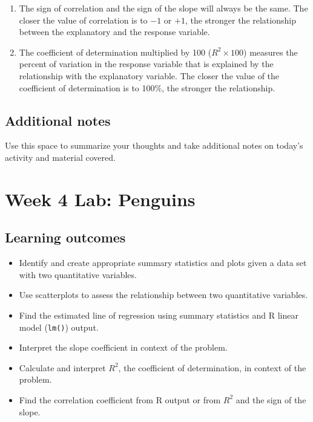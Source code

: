 \documentclass[
]{report}
\begin{document}
\begin{enumerate}
\def\labelenumi{\arabic{enumi}.}
\item
  The sign of correlation and the sign of the slope will always be the same. The closer the value of correlation is to \(-1\) or \(+1\), the stronger the relationship between the explanatory and the response variable.
\item
  The coefficient of determination multiplied by 100 (\(R^2 \times 100\)) measures the percent of variation in the response variable that is explained by the relationship with the explanatory variable. The closer the value of the coefficient of determination is to 100\%, the stronger the relationship.
\end{enumerate}

\hypertarget{additional-notes-6}{%
\subsection{Additional notes}\label{additional-notes-6}}

Use this space to summarize your thoughts and take additional notes on today's activity and material covered.

\newpage

\hypertarget{week-4-lab-penguins}{%
\section{Week 4 Lab: Penguins}\label{week-4-lab-penguins}}


\hypertarget{learning-outcomes-8}{%
\subsection{Learning outcomes}\label{learning-outcomes-8}}

\begin{itemize}
\item
  Identify and create appropriate summary statistics and plots
  given a data set with two quantitative variables.
\item
  Use scatterplots to assess the relationship between two quantitative variables.
\item
  Find the estimated line of regression using summary statistics and R linear model (\texttt{lm()}) output.
\item
  Interpret the slope coefficient in context of the problem.
\item
  Calculate and interpret \(R^2\), the coefficient of determination, in context of the problem.
\item
  Find the correlation coefficient from R output or from \(R^2\) and the sign of the slope.
\end{itemize}
\end{document}
